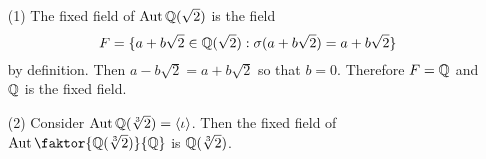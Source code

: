 \begin{example}\label{example_2.2}
    \begin{enumerate}
        \item[(1)] The fixed field of $\operatorname{Aut}{\mathbb{Q}(\sqrt{2})}$ is the field
            \begin{equation*}
                F=\{a+b\sqrt{2} \in \mathbb{Q}(\sqrt{2}) :
                \sigma(a+b\sqrt{2})=a+b\sqrt{2}\}
            \end{equation*}
            by definition. Then $a-b\sqrt{2}=a+b\sqrt{2}$ so that $b=0$. Therefore
            $F=\mathbb{Q}$ and  $\mathbb{Q}$ is the fixed field.

        \item [(2)] Consider $\operatorname{Aut}{\mathbb{Q}(\sqrt[3]{2})}=\langle \iota \rangle$. Then
            the fixed field of $\Aut{\faktor{\Q(\sqrt[3]{2})}{\Q}}$ is
            $\mathbb{Q}(\sqrt[3]{2})$.
    \end{enumerate}
\end{example}

